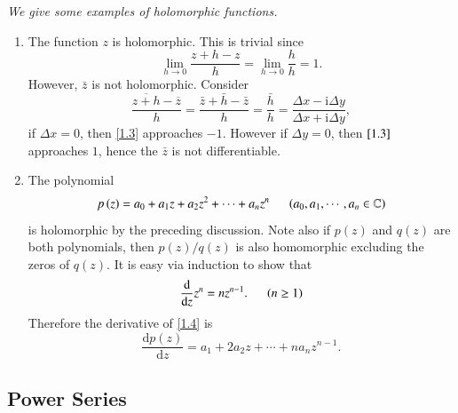 \begin{example}\em
We give some examples of holomorphic functions.
\begin{enumerate}
    \item The function $z$ is holomorphic. This is trivial since 
    $$
    \lim_{h\rightarrow 0} \frac{z+h-z}{h}=\lim_{h\rightarrow 0} \frac{h}{h}=1.
    $$
    However, $\bar{z}$ is not holomorphic. Consider 
    \begin{equation}\label{1.3}
    \frac{\overline{z+h}-\overline{z}}{h}=\frac{\bar{z}+\bar{h}-\bar{z}}{h}=\frac{\bar{h}}{h}=\frac{\Delta x-\mathrm{i}\Delta y}{\Delta x+\mathrm{i}\Delta y},
    \end{equation}
    if $\Delta x=0$, then \eqref{1.3} approaches $-1$. However if $\Delta y=0$, then $\eqref{1.3}$ approaches $1$, hence the $\bar{z}$ is not differentiable.
    \item The polynomial 
    \begin{equation}\label{1.4}
    p\left( z \right) =a_0+a_1z+a_2z^2+\cdots +a_nz^n\hspace{0.5cm}\left( a_0,a_1,\cdots ,a_n\in \mathbb{C} \right) 
    \end{equation}
    is holomorphic by the preceding discussion. Note also if $p(z)$ and $q(z)$ are both polynomials, then $p(z)/q(z)$ is also homomorphic excluding the zeros of $q(z)$. It is easy via induction to show that 
    $$
    \frac{\mathrm{d}}{\mathrm{d}z}z^n=nz^{n-1}.\hspace{0.5cm}\left( n\ge 1 \right) 
    $$
    Therefore the derivative of \eqref{1.4} is 
    $$
    \frac{\mathrm{d}p\left( z \right)}{\mathrm{d}z}=a_1+2a_2z+\cdots +na_nz^{n-1}.
    $$
\end{enumerate}
\end{example}
\subsection{Power Series}

